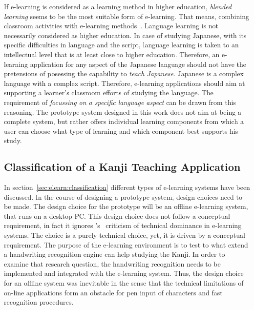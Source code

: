 If e-learning is considered as a learning method in higher education, 
\emph{blended learning} seems to be the most suitable form of e-learning.
That means, combining classroom activities with e-learning 
methods~. Language learning is not 
necessarily considered as higher education. In case of studying Japanese,
with its specific difficulties in language and the script, language learning
is taken to an intellectual level that is at least close to higher education.
Therefore, an e-learning application for any aspect of the Japanese language 
should not have the pretensions of posessing the capability 
to \emph{teach Japanese}. Japanese is a complex language with a complex script.
Therefore, e-learning applications should aim at supporting a learner's 
classroom efforts of studying the language. The requirement of 
\emph{focussing on a specific language aspect} can be drawn from this reasoning.
The prototype system designed in this work does not aim at being a complete
system, but rather offers individual learning components from which a user can 
choose what type of learning and which component best supports his study.

\subsection{Classification of a Kanji Teaching Application}
\label{sec:concept:classificationofakanjiteachingapplication}

In section~\ref{sec:elearn:classification} different types of e-learning systems
have been discussed. In the course of designing a prototype system, 
design choices need to be made.
The design choice for the prototype will be an offline e-learning system,
that runs on a desktop PC.
This design choice does not follow a conceptual requirement, in fact it ignores
's~\citeyear{Ivashin2009} criticism of technical 
dominance in e-learning systems. The choice is a purely technical choice, 
yet, it is driven by a conceptual requirement.
The purpose of the e-learning environment is to test to what extend a handwriting
recognition engine can help studying the Kanji. In order to examine that 
research question, the handwriting recognition needs to be implemented and 
integrated with the e-learning system. 
Thus, the design choice for an offline system was inevitable in the sense that 
the technical limitations of on-line applications form an obstacle for pen 
input of characters and fast recognition procedures.


